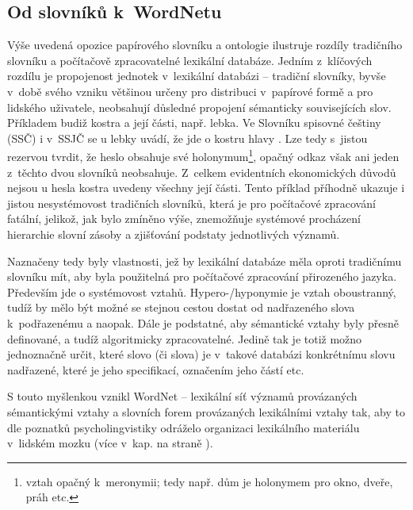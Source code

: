 \documentclass[a4paper, 11pt, oneside, showtrims]{book}
\newcommand{\td}[2][]{
	{\hskip -0.5em\todo[size=\footnotesize]{#2}}
}
\newcommand{\itNameRef}[1]{\textit{\nameref{#1}}}
\newcommand\ex{\textsf}
\begin{document}
				\subsection{Od slovníků k~WordNetu}

					Výše uvedená opozice papírového slovníku a ontologie ilustruje rozdíly tradičního slovníku a počítačově zpracovatelné lexikální databáze. Jedním z~klíčových rozdílu je propojenost jednotek v~lexikální databázi -- tradiční slovníky, byvše v~době svého vzniku většinou určeny pro distribuci v~papírové formě a pro lidského uživatele, neobsahují důsledné propojení sémanticky souvisejících slov. Příkladem budiž \ex{kostra} a její části, např. \ex{lebka}. Ve Slovníku spisovné češtiny (SSČ) i v~SSJČ se u \ex{lebky} uvádí, že jde o \ex{kostru hlavy} \parencite{Havranek1989, filipec2005}. Lze tedy s~jistou rezervou tvrdit, že heslo obsahuje své holonymum\footnote{vztah opačný k~meronymii; tedy např. \ex{dům} je holonymem pro \ex{okno}, \ex{dveře}, \ex{práh} etc.}, opačný odkaz však ani jeden z~těchto dvou slovníků neobsahuje. Z~celkem evidentních ekonomických důvodů nejsou u hesla \ex{kostra} uvedeny všechny její části. Tento příklad příhodně ukazuje i jistou nesystémovost tradičních slovníků, která je pro počítačové zpracování fatální, jelikož, jak bylo zmíněno výše, znemožňuje systémové procházení hierarchie slovní zásoby a zjišťování podstaty jednotlivých významů.

					Naznačeny tedy byly vlastnosti, jež by lexikální databáze měla oproti tradičnímu slovníku mít, aby byla použitelná pro počítačové zpracování přirozeného jazyka. Především jde o systémovost vztahů. Hypero-/hyponymie je vztah oboustranný, tudíž by mělo být možné se stejnou cestou dostat od nadřazeného slova k~podřazenému a naopak. Dále je podstatné, aby sémantické vztahy byly přesně definované, a tudíž algoritmicky zpracovatelné. Jedině tak je totiž možno jednoznačně určit, které slovo (či slova) je v~takové databázi konkrétnímu slovu nadřazené, které je jeho specifikací, označením jeho částí etc. 

					S touto myšlenkou vznikl WordNet -- lexikální síť významů provázaných sémantickými vztahy a slovních forem provázaných lexikálními vztahy tak, aby to dle poznatků psycholingvistiky odráželo organizaci lexikálního materiálu v~lidském mozku (více v~kap. \itNameRef{cha:psycho} na straně \pageref{cha:psycho}). \parencite{pala2013vceska} 

\end{document}
